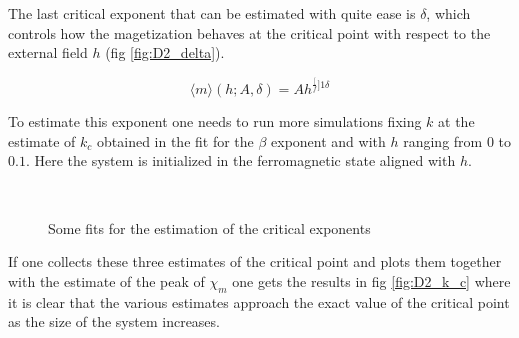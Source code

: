 \documentclass[a4paper, 11pt]{article}
\begin{document}

      The last critical exponent that can be estimated with quite ease is $\delta$, which controls how the magetization behaves at the critical point with respect to the external field $h$ (fig \ref{fig:D2_delta}).

      \begin{equation*}
        \langle m \rangle (h;A,\delta) = Ah^{\frac[f]{1}{\delta}}
      \end{equation*}

      To estimate this exponent one needs to run more simulations fixing $k$ at the estimate of $k_c$ obtained in the fit for the $\beta$ exponent and with $h$ ranging from $0$ to $0.1$. Here the system is initialized in the ferromagnetic state aligned with $h$.

      \begin{figure}[H]
        \centering
        \begin{subfigure}[Fit of the specific heat: estimation of $\alpha_1$, $\alpha_2$.]{
          \label{fig:D2_alpha}}
        \end{subfigure}
        \begin{subfigure}[Fit of the magnetization with respect to $k$ at $h = 0$: estimation of $\beta$.]{
          \label{fig:D2_beta}}
        \end{subfigure}\\
        \begin{subfigure}[Fit of the magnetic susceptibility: estimation of $\gamma_1$, $\gamma_2$.]{
          \label{fig:D2_gamma}}
        \end{subfigure}
        \begin{subfigure}[Fit of the magnetization with respect to $h$ at $k = k_c$: estimation of $\delta$.]{
          \label{fig:D2_delta}}
        \end{subfigure}
        \caption{Some fits for the estimation of the critical exponents}
      \end{figure}

      If one collects these three estimates of the critical point and plots them together with the estimate of the peak of $\chi_m$ one gets the results in fig \ref{fig:D2_k_c} where it is clear that the various estimates approach the exact value of the critical point as the size of the system increases.
\end{document}
